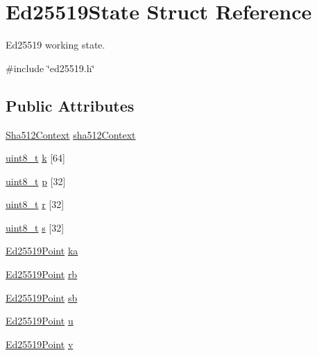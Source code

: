 \hypertarget{structEd25519State}{}\section{Ed25519\+State Struct Reference}
\label{structEd25519State}


Ed25519 working state.  




{\ttfamily \#include \char`\"{}ed25519.\+h\char`\"{}}

\subsection*{Public Attributes}
\begin{DoxyCompactItemize}
\item 
\hyperlink{structSha512Context}{Sha512\+Context} \hyperlink{structEd25519State_afdbdfe5a2f48317949f49d64892e30b1}{sha512\+Context}
\item 
\hyperlink{stdint_8h_aba7bc1797add20fe3efdf37ced1182c5}{uint8\+\_\+t} \hyperlink{structEd25519State_a2d1736dc398ddcbb49e1b2e3cb5b7182}{k} \mbox{[}64\mbox{]}
\item 
\hyperlink{stdint_8h_aba7bc1797add20fe3efdf37ced1182c5}{uint8\+\_\+t} \hyperlink{structEd25519State_adb404431ce31a8acc6cdf1a9f60d708d}{p} \mbox{[}32\mbox{]}
\item 
\hyperlink{stdint_8h_aba7bc1797add20fe3efdf37ced1182c5}{uint8\+\_\+t} \hyperlink{structEd25519State_a2dd4b3e1978f23bef13c5b3fbfbd5fb5}{r} \mbox{[}32\mbox{]}
\item 
\hyperlink{stdint_8h_aba7bc1797add20fe3efdf37ced1182c5}{uint8\+\_\+t} \hyperlink{structEd25519State_a6408b43f2f82c627e4bc602890d1859d}{s} \mbox{[}32\mbox{]}
\item 
\hyperlink{structEd25519Point}{Ed25519\+Point} \hyperlink{structEd25519State_aec75f16ad3e620e0cbceb28e78285332}{ka}
\item 
\hyperlink{structEd25519Point}{Ed25519\+Point} \hyperlink{structEd25519State_a7afd80821acafe24712defd6093d9e0a}{rb}
\item 
\hyperlink{structEd25519Point}{Ed25519\+Point} \hyperlink{structEd25519State_a3a304cf7e6cd67160cabfb98195b6226}{sb}
\item 
\hyperlink{structEd25519Point}{Ed25519\+Point} \hyperlink{structEd25519State_a15570ce8099b0032ccd73a7e62a60803}{u}
\item 
\hyperlink{structEd25519Point}{Ed25519\+Point} \hyperlink{structEd25519State_af078cf4ff8905b1a63935a6298c9ccbe}{v}

\end{DoxyCompactItemize}

